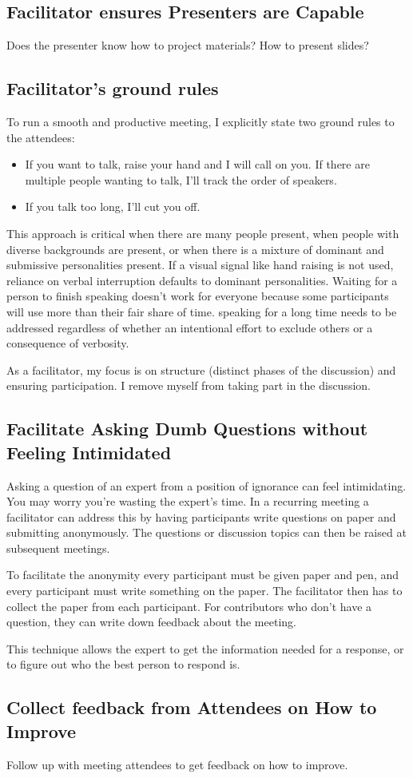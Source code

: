 \subsection*{Facilitator ensures Presenters are Capable}

Does the presenter know how to project materials? How to present slides?

\subsection*{Facilitator's ground rules}

To run a smooth and productive meeting, I explicitly state two ground rules to the attendees:
\begin{itemize}
    \item If you want to talk, raise your hand and I will call on you. If there are multiple people wanting to talk, I'll track the order of speakers.
    \item If you talk too long, I'll cut you off. 
\end{itemize}
This approach is critical when there are many people present, when people with diverse backgrounds are present, or when there is a mixture of dominant and submissive personalities present. 
If a visual signal like hand raising is not used, reliance on verbal interruption defaults to dominant personalities. Waiting for a person to finish speaking doesn't work for everyone because some participants will use more than their fair share of time. speaking for a long time needs to be addressed regardless of whether an intentional effort to exclude others or a consequence of verbosity.

As a facilitator, my focus is on structure (distinct phases of the discussion) and ensuring participation. I remove myself from taking part in the discussion.

\subsection*{Facilitate Asking Dumb Questions without Feeling Intimidated}

Asking a question of an expert from a position of ignorance can feel intimidating. You may worry you're wasting the expert's time. In a recurring meeting a facilitator can address this by having participants write questions on paper and submitting anonymously. The questions or discussion topics can then be raised at subsequent meetings. 

To facilitate the anonymity every participant must be given paper and pen, and every participant must write something on the paper. The facilitator then has to collect the paper from each participant. For contributors who don't have a question, they can write down feedback about the meeting. 

This technique allows the expert to get the information needed for a response, or to figure out who the best person to respond is. 

\subsection*{Collect feedback from Attendees on How to Improve}

Follow up with meeting attendees to get feedback on how to improve.